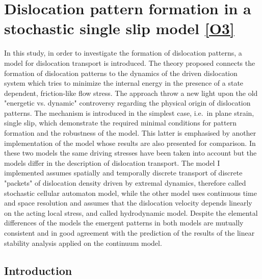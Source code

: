 \chapter[Dislocation patterning]{Dislocation pattern formation in a stochastic single slip model \hyperref[paper:A4]{[O3]}} \label{chapter:pattern}

\ifpdf
    \graphicspath{{Chapter6/Figs/Raster/}{Chapter6/Figs/PDF/}{Chapter6/Figs/}}
\else
    \graphicspath{{Chapter6/Figs/Vector/}{Chapter6/Figs/}}
\fi

In this study, in order to investigate the formation of dislocation patterns, a model for dislocation transport is introduced. The theory proposed connects the formation of dislocation patterns to the dynamics of the driven dislocation system which tries to minimize the internal energy in the presence of a state dependent, friction-like flow stress. The approach throw a new light upon the old "energetic vs. dynamic" controversy regarding the physical origin of dislocation patterns. The mechanism is introduced in the simplest case, i.e.\ in plane strain, single slip, which demonstrate the required minimal conditions for pattern formation and the robustness of the model. This latter is emphasised by another implementation of the model whose results are also presented for comparison. In these two models the same driving stresses have been taken into account but the models differ in the description of dislocation transport. The model I implemented assumes spatially and temporally discrete transport of discrete "packets" of dislocation density driven by extremal dynamics, therefore called stochastic cellular automaton model, while the other model uses continuous time and space resolution and assumes that the dislocation velocity depends linearly on the acting local stress, and called hydrodynamic model. Despite the elemental differences of the models the emergent patterns in both models are mutually consistent and in good agreement with the prediction of the results of the linear stability analysis applied on the continuum model.

\section{Introduction}

